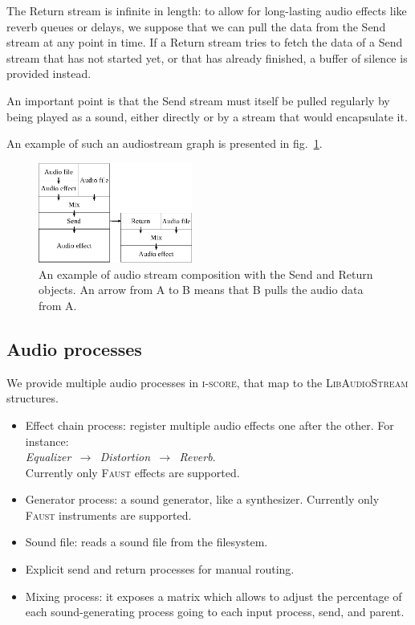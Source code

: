 \documentclass{article}
\newcommand*{\LibAudioStream}{\textsc{LibAudioStream}\xspace}
\newcommand*{\iscore}{\textsc{i-score}\xspace}
\newcommand*{\faust}{\textsc{Faust}\xspace}
\begin{document}
The Return stream is infinite in length: to allow for long-lasting audio effects 
like reverb queues or delays, we suppose that we can pull the data from the Send stream at any point in time.
If a Return stream tries to fetch the data of a Send stream that has not started yet, or that has already finished, a buffer of silence is provided instead.

An important point is that the Send stream must itself be pulled regularly by being played as a sound, either directly or by a stream that would encapsulate it.

An example of such an audiostream graph is presented in fig.~\ref{fig.mixsendreturn}.

\begin{figure}[h]
	\centering
	\includegraphics[width=0.45\textwidth]{figures/graph2.eps}
	\caption{An example of audio stream composition with the Send and Return objects. An arrow from A to B means that B pulls the audio data from A.}
	\label{fig.mixsendreturn}
\end{figure}

\subsection{Audio processes}
\label{sec.processes}
We provide multiple audio processes in \iscore, that map 
to the \LibAudioStream structures.

\begin{itemize}
	\item Effect chain process: register multiple audio effects one after the other. 
	For instance:~\\ \emph{Equalizer $\,\to\,$ Distortion $\,\to\,$ Reverb}. ~\\
	Currently only \faust effects are supported.
	\item Generator process: a sound generator, like a synthesizer. 
	Currently only \faust instruments are supported.
	\item Sound file: reads a sound file from the filesystem.
	\item Explicit send and return processes for manual routing.
	\item Mixing process: it exposes a matrix which allows to adjust the percentage of each sound-generating process going to each input process, send, and parent.
\end{itemize}
\end{document}
